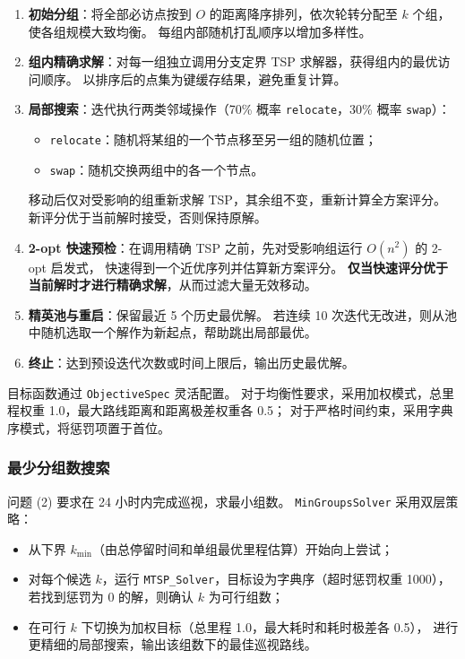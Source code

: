 \documentclass[a4paper, 12pt]{article}
\begin{document}
\begin{enumerate}
    \item \textbf{初始分组}：将全部必访点按到 $O$ 的距离降序排列，依次轮转分配至 $k$ 个组，使各组规模大致均衡。
          每组内部随机打乱顺序以增加多样性。
    \item \textbf{组内精确求解}：对每一组独立调用分支定界 TSP 求解器，获得组内的最优访问顺序。
          以排序后的点集为键缓存结果，避免重复计算。
    \item \textbf{局部搜索}：迭代执行两类邻域操作（70\% 概率 \texttt{relocate}，30\% 概率 \texttt{swap}）：
          \begin{itemize}
              \item \texttt{relocate}：随机将某组的一个节点移至另一组的随机位置；
              \item \texttt{swap}：随机交换两组中的各一个节点。
          \end{itemize}
          移动后仅对受影响的组重新求解 TSP，其余组不变，重新计算全方案评分。
          新评分优于当前解时接受，否则保持原解。
    \item \textbf{2-opt 快速预检}：在调用精确 TSP 之前，先对受影响组运行 $O(n^2)$ 的 2-opt 启发式，
          快速得到一个近优序列并估算新方案评分。
          \textbf{仅当快速评分优于当前解时才进行精确求解}，从而过滤大量无效移动。
    \item \textbf{精英池与重启}：保留最近 5 个历史最优解。
          若连续 10 次迭代无改进，则从池中随机选取一个解作为新起点，帮助跳出局部最优。
    \item \textbf{终止}：达到预设迭代次数或时间上限后，输出历史最优解。
\end{enumerate}

目标函数通过 \texttt{ObjectiveSpec} 灵活配置。
对于均衡性要求，采用加权模式，总里程权重 1.0，最大路线距离和距离极差权重各 0.5；
对于严格时间约束，采用字典序模式，将惩罚项置于首位。

\subsubsection{最少分组数搜索}

问题 (2) 要求在 24 小时内完成巡视，求最小组数。
\texttt{MinGroupsSolver} 采用双层策略：
\begin{itemize}
    \item 从下界 $k_{\min}$（由总停留时间和单组最优里程估算）开始向上尝试；
    \item 对每个候选 $k$，运行 \texttt{MTSP\_Solver}，目标设为字典序（超时惩罚权重 1000），
          若找到惩罚为 0 的解，则确认 $k$ 为可行组数；
    \item 在可行 $k$ 下切换为加权目标（总里程 1.0，最大耗时和耗时极差各 0.5），
          进行更精细的局部搜索，输出该组数下的最佳巡视路线。
\end{itemize}
\end{document}
